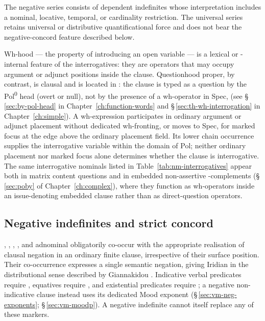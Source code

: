 The negative series consists of dependent
indefinites whose interpretation includes a nominal, locative, temporal, or
cardinality restriction. The universal series retains universal or
distributive quantificational force and does not bear the negative-concord
feature described below.

Wh-hood ---
the property of introducing an open variable --- is a lexical or
-internal feature of the interrogatives: they are operators
that may occupy argument or adjunct positions inside the clause. Questionhood
proper, by contrast, is clausal and is located in : the clause is
typed as a question by the Pol\textsuperscript{0} head (overt  or null),
not by the presence of a wh-operator in Spec, (see
§\,\ref{sec:by-pol-head} in Chapter~\ref{ch:function-words} and
§\,\ref{sec:th-wh-interrogation} in Chapter~\ref{ch:simple}). A wh-expression participates in ordinary argument or adjunct placement
without dedicated wh-fronting, or moves to Spec, for marked
focus at the edge above the ordinary placement field. Its lower chain
occurrence supplies the interrogative variable within the domain of Pol;
neither ordinary placement nor marked focus alone determines whether the
clause is interrogative. The same
interrogative nominals listed in Table~\ref{tab:nm-interrogatives} appear both
in matrix content questions and in embedded non-assertive -complements
(§\,\ref{sec:poby} of Chapter~\ref{ch:complex}), where they function as
wh-operators inside an issue-denoting embedded clause rather than as
direct-question operators.

\pex
\a {} 
\a {} 
\a {} 
\a {}  
\xe

\subsection{Negative indefinites and strict concord}
\label{sec:nm-negative-concord}
 ,  , 
,  , and adnominal 
 obligatorily co-occur with the appropriate realisation of
clausal negation in an ordinary finite clause, irrespective of their surface
position. Their co-occurrence expresses a single semantic negation, giving
Iridian  in the distributional sense described
by Giannakidou \cite{giannakidou2006}. Indicative verbal predicates require
, equatives require , and existential predicates require
; a negative non-indicative clause instead uses its dedicated Mood
exponent (§\,\ref{sec:vm-neg-exponents}; §\,\ref{sec:vm-moodp}). A
negative indefinite cannot itself replace any of these markers.

